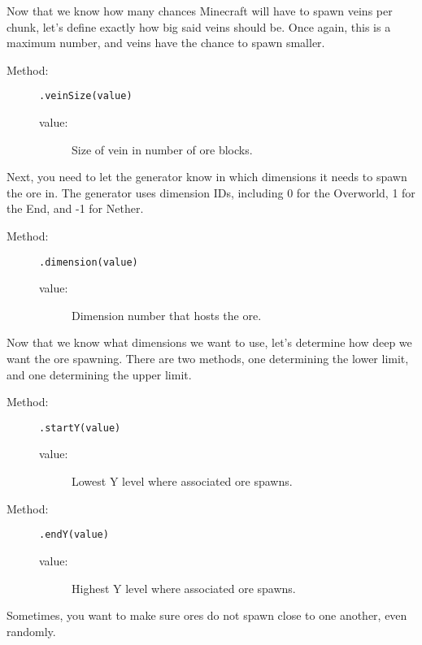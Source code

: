 \documentclass[letterpaper,titlepage,12pt]{article}
\begin{document}
Now that we know how many chances Minecraft will have to spawn veins per chunk, let's define exactly how big said veins should be.  Once again, this is a maximum number, and veins have the chance to spawn smaller.

\begin{description}
\item[Method:] \texttt{.veinSize(value)}
\begin{description}
\item [value:] Size of vein in number of ore blocks.
\end{description}
\end{description}

Next, you need to let the generator know in which dimensions it needs to spawn the ore in.  The generator uses dimension IDs, including 0 for the Overworld, 1 for the End, and -1 for Nether.

\begin{description}
\item[Method:] \texttt{.dimension(value)}
\begin{description}
\item [value:] Dimension number that hosts the ore.
\end{description}
\end{description}

Now that we know what dimensions we want to use, let's determine how deep we want the ore spawning.  There are two methods, one determining the lower limit, and one determining the upper limit.

\begin{description}
\item[Method:] \texttt{.startY(value)}
\begin{description}
\item [value:] Lowest Y level where associated ore spawns.
\end{description}
\end{description}

\begin{description}
\item[Method:] \texttt{.endY(value)}
\begin{description}
\item [value:] Highest Y level where associated ore spawns.
\end{description}
\end{description}

Sometimes, you want to make sure ores do not spawn close to one another, even randomly.
\end{document}
